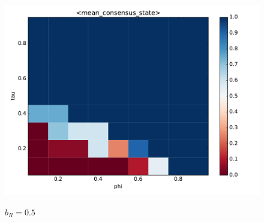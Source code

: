 \begin{minipage}{.55 \textwidth}
	\begin{figure}[H]
		\centering
		\includegraphics[width = \linewidth]{figures/mean_consensus_stateb_r0o5.pdf}

	\end{figure}
\end{minipage}\begin{minipage}{.33 \textwidth}
	\begin{figure}[H]
		\caption{$b_R = 0.5$\label{fig:figA}}
		
	\end{figure}
\end{minipage}
\vspace{-1cm}


